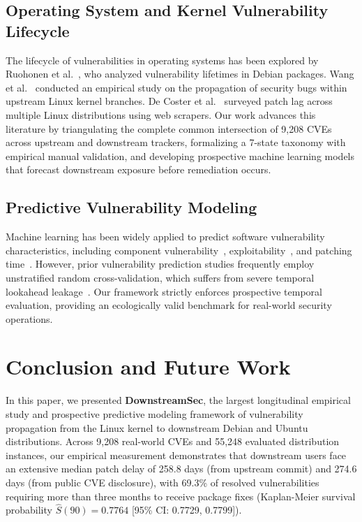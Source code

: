 \documentclass[final,5p,times,twocolumn]{elsarticle}
\begin{document}
\subsection{Operating System and Kernel Vulnerability Lifecycle}
The lifecycle of vulnerabilities in operating systems has been explored by Ruohonen et al.~\citep{ruohonen2018empirical, ruohonen2019tracking}, who analyzed vulnerability lifetimes in Debian packages. Wang et al.~\citep{wang2020empirical} conducted an empirical study on the propagation of security bugs within upstream Linux kernel branches. De Coster et al.~\citep{decoster2022measuring} surveyed patch lag across multiple Linux distributions using web scrapers. Our work advances this literature by triangulating the complete common intersection of 9,208 CVEs across upstream and downstream trackers, formalizing a 7-state taxonomy with empirical manual validation, and developing prospective machine learning models that forecast downstream exposure before remediation occurs.

\subsection{Predictive Vulnerability Modeling}
Machine learning has been widely applied to predict software vulnerability characteristics, including component vulnerability~\citep{neuhaus2009predicting, scandariato2014predicting}, exploitability~\citep{freitas2021predicting}, and patching time~\citep{saha2018understanding}. However, prior vulnerability prediction studies frequently employ unstratified random cross-validation, which suffers from severe temporal lookahead leakage~\citep{zimmermann2010predicting}. Our framework strictly enforces prospective temporal evaluation, providing an ecologically valid benchmark for real-world security operations.

\section{Conclusion and Future Work}
\label{sec:conclusion}

In this paper, we presented \textbf{DownstreamSec}, the largest longitudinal empirical study and prospective predictive modeling framework of vulnerability propagation from the Linux kernel to downstream Debian and Ubuntu distributions. Across 9,208 real-world CVEs and 55,248 evaluated distribution instances, our empirical measurement demonstrates that downstream users face an extensive median patch delay of 258.8 days (from upstream commit) and 274.6 days (from public CVE disclosure), with 69.3\% of resolved vulnerabilities requiring more than three months to receive package fixes (Kaplan-Meier survival probability $\hat{S}(90) = 0.7764$ [95\% CI: 0.7729, 0.7799]).
\end{document}
